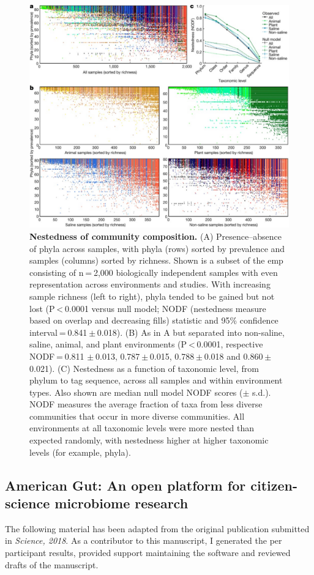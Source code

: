 \begin{figure}[htbp]
\includegraphics[width=\columnwidth]{chapter_contributions_figures/EMPNestedness.pdf}
\caption[Nestedness of community composition]{\textbf{Nestedness of community composition.}
(A) Presence–absence of phyla across samples, with phyla (rows) sorted by prevalence and samples
(columns) sorted by richness. Shown is a subset of the \gls{emp} consisting of n = 2,000
biologically independent samples with even representation across environments and studies.
With increasing sample richness (left to right), phyla tended to be gained but not lost
(P < 0.0001 versus null model; NODF (nestedness measure based on overlap and decreasing fills)
statistic and 95\% confidence interval = 0.841 $\pm$ 0.018). (B) As in A but separated into
non-saline, saline, animal, and plant environments (P < 0.0001, respective NODF = 0.811
$\pm$ 0.013, 0.787 $\pm$ 0.015, 0.788 $\pm$ 0.018 and 0.860 $\pm$ 0.021). (C) Nestedness as
a function of taxonomic level, from phylum to tag sequence, across all samples and within
environment types. Also shown are median null model NODF scores ($\pm$ s.d.).
NODF measures the average fraction of taxa from less diverse communities that occur in
more diverse communities. All environments at all taxonomic levels were more nested than
expected randomly, with nestedness higher at higher taxonomic levels (for example, phyla).}
\label{EMPNestedness}
\end{figure}

\subsection{American Gut: An open platform for citizen-science microbiome research}\label{subsection_ag}
The following material has been adapted from the original publication submitted in
\textsl{Science, 2018}. As a contributor to this manuscript, I generated the per
participant results, provided support maintaining the software and reviewed drafts
of the manuscript.

